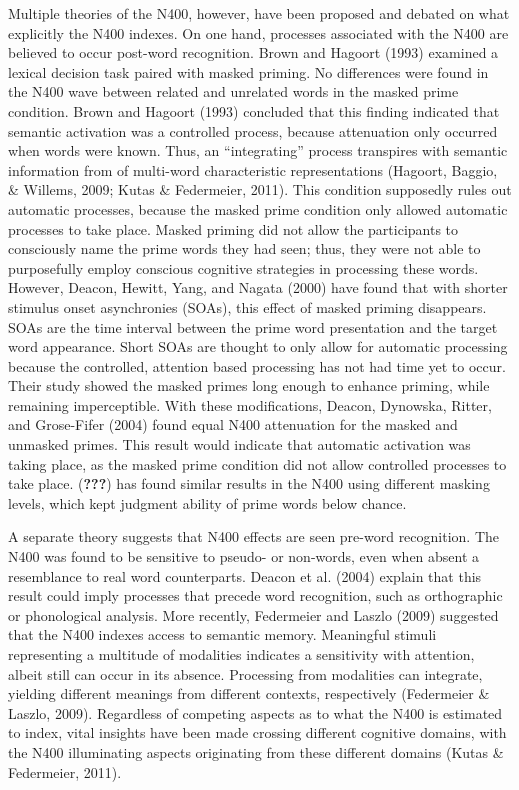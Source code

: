 \documentclass[english,man]{apa6}
\theoremstyle{definition}
\theoremstyle{definition}
\theoremstyle{definition}
\theoremstyle{remark}
\begin{document}
Multiple theories of the N400, however, have been proposed and debated
on what explicitly the N400 indexes. On one hand, processes associated
with the N400 are believed to occur post-word recognition. Brown and
Hagoort (1993) examined a lexical decision task paired with masked
priming. No differences were found in the N400 wave between related and
unrelated words in the masked prime condition. Brown and Hagoort (1993)
concluded that this finding indicated that semantic activation was a
controlled process, because attenuation only occurred when words were
known. Thus, an \enquote{integrating} process transpires with semantic
information from of multi-word characteristic representations (Hagoort,
Baggio, \& Willems, 2009; Kutas \& Federmeier, 2011). This condition
supposedly rules out automatic processes, because the masked prime
condition only allowed automatic processes to take place. Masked priming
did not allow the participants to consciously name the prime words they
had seen; thus, they were not able to purposefully employ conscious
cognitive strategies in processing these words. However, Deacon, Hewitt,
Yang, and Nagata (2000) have found that with shorter stimulus onset
asynchronies (SOAs), this effect of masked priming disappears. SOAs are
the time interval between the prime word presentation and the target
word appearance. Short SOAs are thought to only allow for automatic
processing because the controlled, attention based processing has not
had time yet to occur. Their study showed the masked primes long enough
to enhance priming, while remaining imperceptible. With these
modifications, Deacon, Dynowska, Ritter, and Grose-Fifer (2004) found
equal N400 attenuation for the masked and unmasked primes. This result
would indicate that automatic activation was taking place, as the masked
prime condition did not allow controlled processes to take place.
({\textbf{???}}) has found similar results in the N400 using different
masking levels, which kept judgment ability of prime words below chance.

A separate theory suggests that N400 effects are seen pre-word
recognition. The N400 was found to be sensitive to pseudo- or non-words,
even when absent a resemblance to real word counterparts. Deacon et al.
(2004) explain that this result could imply processes that precede word
recognition, such as orthographic or phonological analysis. More
recently, Federmeier and Laszlo (2009) suggested that the N400 indexes
access to semantic memory. Meaningful stimuli representing a multitude
of modalities indicates a sensitivity with attention, albeit still can
occur in its absence. Processing from modalities can integrate, yielding
different meanings from different contexts, respectively (Federmeier \&
Laszlo, 2009). Regardless of competing aspects as to what the N400 is
estimated to index, vital insights have been made crossing different
cognitive domains, with the N400 illuminating aspects originating from
these different domains (Kutas \& Federmeier, 2011).
\end{document}
